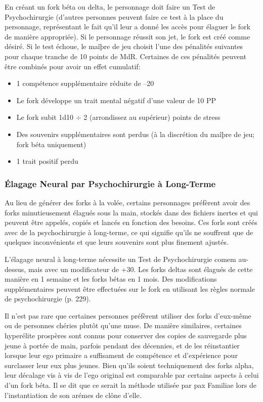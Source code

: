 En créant un fork béta ou delta, le personnage doit faire un Test de Psychochirurgie (d'autres personnes peuvent faire ce test à la place du personnage, représentant le fait qu'il leur a donné les accès pour élaguer le fork de manière appropriée). Si le personnage réussit son jet, le fork est créé comme désiré. Si le test échoue, le maîþre de jeu choisit l'une des pénalités suivantes pour chaque tranche de 10 points de MdR. Certaines de ces pénalités peuvent être combinés pour avoir un effet cumulatif: 

\begin{itemize} \item 1 compétence supplémentaire réduite de –20 \item Le fork développe un trait mental négatif d'une valeur de 10 PP \item Le fork subit 1d10 $\div$ 2 (arrondissez au supérieur) points de stress\item Des souvenirs supplémentaires sont perdus (à la discrétion du maîþre de jeu; fork béta uniquement) \item 1 trait positif perdu \end{itemize} 

\subsubsection{Élagage Neural par Psychochirurgie à Long-Terme} 

Au lieu de générer des forks à la volée, certains personnages préfèrent avoir des forks minutieusement élagués sous la main, stockés dans des fichiers inertes et qui peuvent être appelés, copiés et lancés en fonction des besoins. Ces forls sont créés avec de la psychochirurgie à long-terme, ce qui signifie qu'ils ne souffrent que de quelques inconvénients et que leurs souvenirs sont plus finement ajustés. 

L'élagage neural à long-terme nécessite un Test de Psychochirurgie comem au-dessus, mais avec un modificateur de +30. Les forks deltas sont élagués de cette manière en 1 semaine et les forks bétas en 1 mois. Des modifications supplémentaires peuvent être effectuées sur le fork en utilisant les règles normale de psychochirurgie (p. 229). 

Il n'est pas rare que certaines personnes préfèrent utiliser des forks d'eux-même ou de personnes chéries plutôt qu'une muse. De manière similaires, certaines hyperélite prospères sont connus pour conserver des copies de sauvegarde plus jeune à portée de main, parfois pendant des décennies, et de les réinstantier lorsque leur ego primaire a suffisament de compétence et d'expérience pour surclasser leur eux plus jeunes. Bien qu'ils soient techniquement des forks alpha, leur décalage vis à vis de l'ego original est comparable par certains aspects à celui d'un fork béta. Il se dit que ce serait la méthode utilisée par pax Familiae lors de l'instantiation de son arémes de clône d'elle. 

